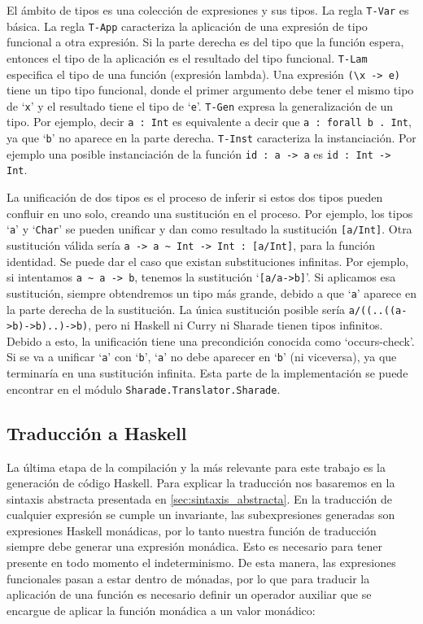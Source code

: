 \documentclass[class=article, crop=false]{standalone}
\begin{document}
El ámbito de tipos es una colección de expresiones y sus tipos. La regla
\verb`T-Var` es básica. La regla \verb`T-App` caracteriza la aplicación de una expresión de
tipo funcional a otra expresión. Si la parte derecha es del tipo que la función espera,
entonces el tipo de la aplicación es el resultado del tipo funcional. \verb`T-Lam` especifica
el tipo de una función (expresión lambda). Una expresión \verb`(\x -> e)` tiene un tipo
tipo funcional, donde el primer argumento debe tener el mismo tipo de `\verb`x`' y el
resultado tiene el tipo de `\verb`e`'. \verb`T-Gen` expresa la generalización de un tipo. Por
ejemplo, decir \verb`a : Int` es equivalente a decir que \verb`a : forall b . Int`, ya que
`\verb`b`' no aparece en la parte derecha. \verb`T-Inst` caracteriza la instanciación. Por
ejemplo una posible instanciación de la función \verb`id : a -> a` es \verb`id : Int -> Int`.

La unificación de dos tipos es el proceso de inferir si estos dos tipos pueden confluir en
uno solo, creando una sustitución en el proceso. Por ejemplo, los tipos `\verb`a`' y
`\verb`Char`' se pueden unificar y dan como resultado la sustitución \verb`[a/Int]`. Otra
sustitución válida sería \verb`a -> a ~ Int -> Int : [a/Int]`, para la función identidad. Se
puede dar el caso que existan substituciones infinitas. Por ejemplo, si intentamos
\verb`a ~ a -> b`, tenemos la sustitución `\verb`[a/a->b]`'. Si aplicamos esa sustitución,
siempre obtendremos un tipo más grande, debido a que `\verb`a`' aparece en la parte derecha
de la sustitución. La única sustitución posible sería \verb`a/((..((a->b)->b)..)->b)`, pero
ni Haskell ni Curry ni Sharade tienen tipos infinitos. Debido a esto, la unificación tiene
una precondición conocida como `occurs-check'. Si se va a unificar `\verb`a`' con `\verb`b`',
`\verb`a`' no debe aparecer en `\verb`b`' (ni viceversa), ya que terminaría en una
sustitución infinita. Esta parte de la implementación se puede encontrar en el módulo
\verb`Sharade.Translator.Sharade`.

\subsection{Traducción a Haskell}\label{sec:traduccion}

La última etapa de la compilación y la más relevante para este trabajo es la generación de
código Haskell. Para explicar la traducción nos basaremos en la sintaxis abstracta presentada
en \ref{sec:sintaxis_abstracta}. En la traducción de cualquier expresión se cumple un
invariante, las subexpresiones generadas son expresiones Haskell monádicas, por lo tanto
nuestra función de traducción siempre debe generar una expresión monádica. Esto es necesario
para tener presente en todo momento el indeterminismo. De esta manera, las expresiones
funcionales pasan a estar dentro de mónadas, por lo que para traducir la aplicación de una
función es necesario definir un operador auxiliar que se encargue de aplicar la función
monádica a un valor monádico:
\end{document}
